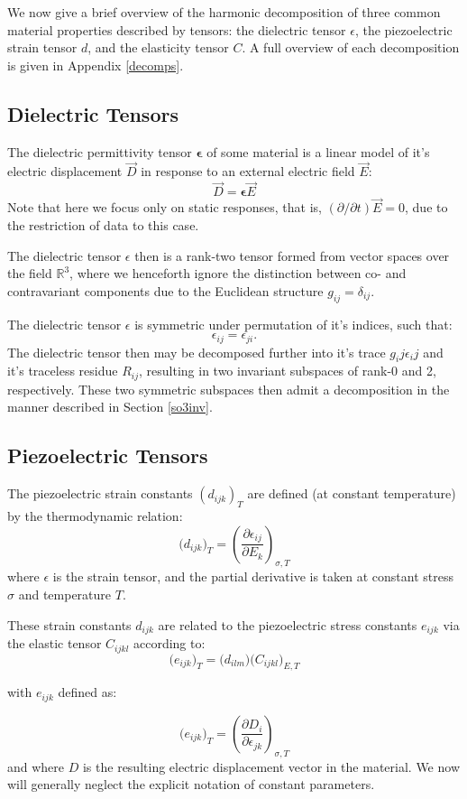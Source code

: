 \documentclass[10pt,a4paper]{article}
\begin{document}
We now give a brief overview of the harmonic decomposition of three common material properties described by tensors: the dielectric tensor $\epsilon$, the piezoelectric strain tensor $d$, and the elasticity tensor $C$. A full overview of each decomposition is given in Appendix \ref{decomps}.

\subsection{Dielectric Tensors}
The dielectric permittivity tensor  $\mathbf{\epsilon}$ of some material is a linear model of it's electric displacement $\vec{D}$ in response to an external electric field $\vec{E}$:
$$
\vec{D}=\mathbf{\epsilon}\vec{E}
$$
Note that here we focus only on static responses, that is, $(\partial/\partial t)\vec{E}=0$, due to the restriction of data to this case. 

The dielectric tensor $\epsilon$ then is a rank-two tensor formed from vector spaces over the field $\mathbb{R}^3$, where we henceforth ignore the distinction between co- and contravariant components due to the Euclidean structure $g_{ij}=\delta_{ij}$.

The dielectric tensor  $\epsilon$ is symmetric under permutation of it's indices, such that:
$$
\epsilon_{ij}=\epsilon_{ji}.
$$
The dielectric tensor then may be decomposed further into it's trace $g_ij\epsilon_ij$ and it's traceless residue $R_{ij}$, resulting in two invariant subspaces of rank-0 and 2, respectively. These two symmetric subspaces then admit a decomposition in the manner described in Section \ref{so3inv}.

\subsection{Piezoelectric Tensors}
The piezoelectric strain constants $(d_{ijk})_{T}$ are defined (at constant temperature) by the thermodynamic relation:
$$
\big(d_{ijk}\big)_{T}=\left(\frac{\partial \epsilon_{ij}}{\partial E_k} \right)_{\sigma, T}
$$
where $\epsilon$ is the strain tensor, and the partial derivative is taken at constant stress $\sigma$ and temperature $T$.

These strain constants $d_{ijk}$ are related to the piezoelectric stress constants $e_{ijk}$ via the elastic tensor $C_{ijkl}$ according to:
$$
\big(e_{ijk}\big)_T=\big(d_{ilm}\big)\big(C_{ijkl}\big)_{E,T}
$$
\begin{center}
with $e_{ijk}$ defined as:
\end{center}
$$
\big(e_{ijk}\big)_{T}=\left(\frac{\partial D_{i}}{\partial \epsilon_{jk}} \right)_{\sigma, T}
$$
and where $D$ is the resulting electric displacement vector in the material. We now will generally neglect the explicit notation of constant parameters.
\end{document}
